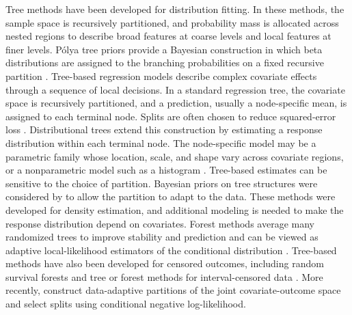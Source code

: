 \documentclass[11pt]{article}
\numberwithin{equation}{section}
\begin{document}
Tree methods have been developed for distribution fitting. In these methods, the sample space is recursively partitioned, and probability mass is allocated across nested regions to describe broad features at coarse levels and local features at finer levels. P\'olya tree priors provide a Bayesian construction in which beta distributions are assigned to the branching probabilities on a fixed recursive partition \citep{mauldin_polya_1992,lavine_aspects_1992}. Tree-based regression models describe complex covariate effects through a sequence of local decisions. In a standard regression tree, the covariate space is recursively partitioned, and a prediction, usually a node-specific mean, is assigned to each terminal node. Splits are often chosen to reduce squared-error loss \citep{taylor_splitting_1996,loh_classification_2011}. Distributional trees extend this construction by estimating a response distribution within each terminal node. The node-specific model may be a parametric family whose location, scale, and shape vary across covariate regions, or a nonparametric model such as a histogram \citep{zeileis_model-based_2008,schlosser_distributional_2019,yang_conditional_2024}. Tree-based estimates can be sensitive to the choice of partition. Bayesian priors on tree structures were considered by \citet{wong_optional_2010,awaya_hidden_2024} to allow the partition to adapt to the data. These methods were developed for density estimation, and additional modeling is needed to make the response distribution depend on covariates. Forest methods average many randomized trees to improve stability and prediction and can be viewed as adaptive local-likelihood estimators of the conditional distribution \citep{schlosser_distributional_2019,hothorn_predictive_2021}. Tree-based methods have also been developed for censored outcomes, including random survival forests \citep{ishwaran_random_2008} and tree or forest methods for interval-censored data \citep{fu_survival_2017,yao_ensemble_2021}. More recently, \citet{angelim_partition_2026} construct data-adaptive partitions of the joint covariate-outcome space and select splits using conditional negative log-likelihood.
\end{document}
